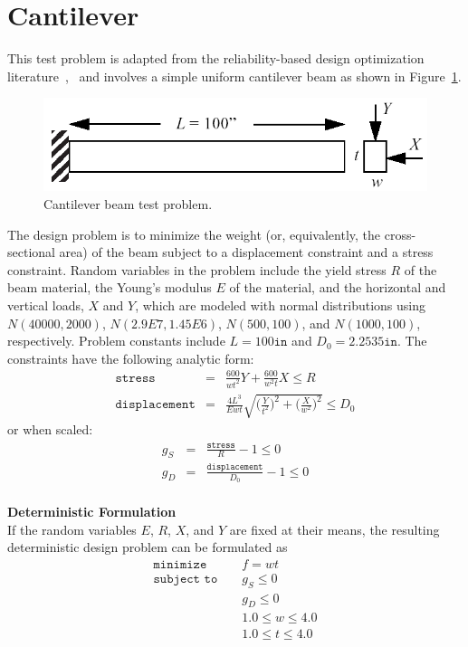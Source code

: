 
\section{Cantilever}\label{additional:cantilever}

This test problem is adapted from the reliability-based design
optimization literature~\cite{Sue01},~\cite{Wu01} and involves a simple
uniform cantilever beam as shown in Figure~\ref{additional:figure03}.

\begin{figure}[hbp]
  \centering
  \includegraphics[scale=0.5]{images/cantilever_beam}
  \caption{Cantilever beam test problem.}
  \label{additional:figure03}
\end{figure}

The design problem is to minimize the weight (or, equivalently, the
cross-sectional area) of the beam subject to a displacement constraint
and a stress constraint. Random variables in the problem include the
yield stress $R$ of the beam material, the Young's modulus $E$ of the
material, and the horizontal and vertical loads, $X$ and $Y$, which
are modeled with normal distributions using $N(40000, 2000)$,
$N(2.9E7, 1.45E6)$, $N(500, 100)$, and $N(1000, 100)$, respectively.
Problem constants include $L = 100\mathtt{in}$ and $D_{0} = 2.2535
\mathtt{in}$. The constraints have the following analytic form:
\begin{eqnarray}
\mathtt{stress}&=&\frac{600}{w t^2}Y+\frac{600}{w^2t}X \leq R
  \label{additional:cant}\\
\mathtt{displacement}&=&\frac{4L^3}{E w t}
  \sqrt{\bigg(\frac{Y}{t^2}\bigg)^2+\bigg(\frac{X}{w^2}\bigg)^2}
  \leq D_{0} \nonumber
\end{eqnarray}
or when scaled:
\begin{eqnarray}
  g_{S}&=&\frac{\mathtt{stress}}{R}-1 \leq 0\label{additional:cantscale}\\
  g_{D}&=&\frac{\mathtt{displacement}}{D_{0}}-1 \leq 0\nonumber\\
\end{eqnarray}

{\bf Deterministic Formulation } \\
If the random variables $E$, $R$, $X$, and $Y$ are fixed at their
means, the resulting deterministic design problem can be formulated as
\begin{eqnarray}
\texttt{minimize }   & & f = w t            \nonumber\\
\texttt{subject to } & & g_{S} \leq 0 \label{additional:cantopt}\\
                     & & g_{D} \leq 0       \nonumber\\
                     & & 1.0 \leq w \leq 4.0\nonumber\\
                     & & 1.0 \leq t \leq 4.0\nonumber
\end{eqnarray}

